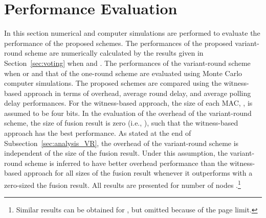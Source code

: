 \documentclass[12pt, onecolumn, draftcls]{IEEEtran}
\begin{document}
\section{Performance Evaluation}
\label{sec:performance} In this section numerical and computer
simulations are performed to evaluate the performance of the
proposed schemes. The performances of the proposed variant-round
scheme are numerically calculated by the results given in
Section~\ref{sec:voting} when  and . The performances of
the variant-round scheme when  or  and that of the
one-round scheme are evaluated using Monte Carlo computer
simulations. The proposed schemes are compared using the
witness-based approach in terms of overhead, average round delay,
and average polling delay performances. For the witness-based
approach, the size of each MAC, , is assumed to be four bits.
In the evaluation of the overhead of the variant-round scheme, the
size of fusion result is zero (i.e., ), such that the
witness-based approach has the best performance. As stated at the
end of Subsection~\ref{sec:analysis_VR}, the overhead of the
variant-round scheme is independent of the size of the fusion
result. Under this assumption, the variant-round scheme is inferred
to have better overhead performance than the witness-based approach
for all sizes of the fusion result whenever it outperforms with a
zero-sized the fusion result. All results are presented for number
of nodes .\footnote{Similar results can be obtained for
, but omitted because of the page limit.}
\end{document}
